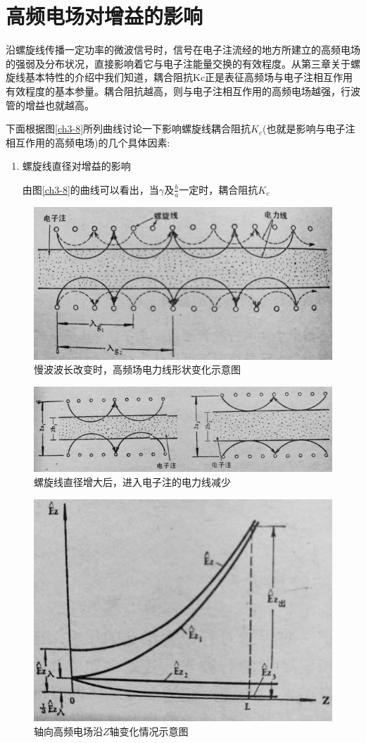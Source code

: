 \section{高频电场对增益的影响}
沿螺旋线传播一定功率的微波信号时，信号在电子注流经的地方所建立的高频电场的强弱及分布状况，直接影响着它与电子注能量交换的有效程度。从第三章关于螺旋线基本特性的介绍中我们知道，耦合阻抗Kc正是表征高频场与电子注相互作用有效程度的基本参量。耦合阻抗越高，则与电子注相互作用的高频电场越强，行波管的增益也就越高。


下面根据图\ref{ch3-8}所列曲线讨论一下影响螺旋线耦合阻抗$ K_c $(也就是影响与电子注相互作用的高频电场)的几个具体因素:
\begin{enumerate}
	\item 螺旋线直径对增益的影响
	
	由图\ref{ch3-8}的曲线可以看出，当$ \gamma $及$ \frac{b}{a} $一定时，耦合阻抗$ K_c $
\end{enumerate}





\begin{figure}[phtb]
	\centering
	\includegraphics[width=0.65\linewidth]{figure/ch4-1}
	\caption{慢波波长改变时，高频场电力线形状变化示意图}
	\label{ch4-1}
\end{figure}

\begin{figure}[phtb]
	\centering
	\includegraphics[width=0.65\linewidth]{figure/ch4-2}
	\caption{螺旋线直径增大后，进入电子注的电力线减少}
	\label{ch4-2}
\end{figure}

\begin{figure}[phtb]
	\centering
	\includegraphics[width=0.65\linewidth]{figure/ch4-3}
	\caption{轴向高频电场沿$ Z $轴变化情况示意图}
	\label{ch4-3}
\end{figure}







